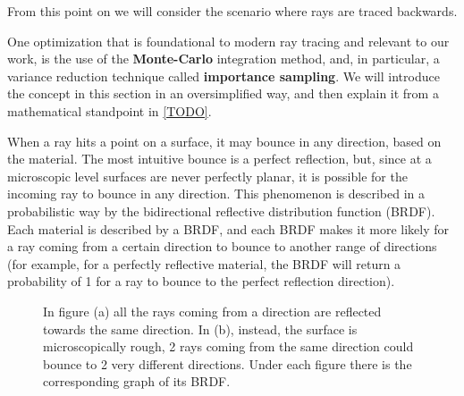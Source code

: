 \documentclass{PoliMi_MasterThesis}
\begin{document}
From this point on we will consider the scenario where rays are traced backwards.

One optimization that is foundational to modern ray tracing and relevant to our work, is the use of the \textbf{Monte-Carlo} integration method, and, in particular, a variance reduction technique called \textbf{importance sampling}. We will introduce the concept in this section in an oversimplified way, and then explain it from a mathematical standpoint in \ref{TODO}.

When a ray hits a point on a surface, it may bounce in any direction, based on the material. The most intuitive bounce is a perfect reflection, but, since at a microscopic level surfaces are never perfectly planar, it is possible for the incoming ray to bounce in any direction. This phenomenon is described in a probabilistic way by the bidirectional reflective distribution function (BRDF). Each material is described by a BRDF, and each BRDF makes it more likely for a ray coming from a certain direction to bounce to another range of directions (for example, for a perfectly reflective material, the BRDF will return a probability of 1 for a ray to bounce to the perfect reflection direction).

\begin{figure}[H]
    \centering
		\qquad
	\caption{In figure (a) all the rays coming from a direction are reflected towards the same direction. In (b), instead, the surface is microscopically rough, 2 rays coming from the same direction could bounce to 2 very different directions. Under each figure there is the corresponding graph of its BRDF.} 
    \label{fig:surfaces_reflectiveness}
\end{figure}
\end{document}
